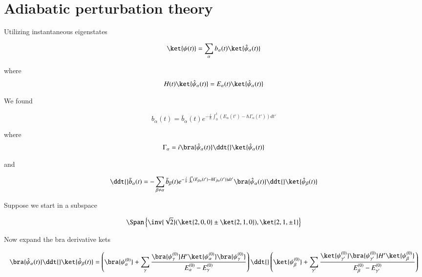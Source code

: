 \section{Adiabatic perturbation theory}

Utilizing instantaneous eigenstates

\begin{equation}\label{eqn:qmTwoR3:390}
\ket{\psi(t)} = \sum_{\alpha} b_\alpha(t) \ket{\hat{\psi}_\alpha(t)}
\end{equation}

where
\begin{equation}\label{eqn:qmTwoR3:410}
H(t) \ket{\hat{\psi}_\alpha(t)}
= E_\alpha(t) \ket{\hat{\psi}_\alpha(t)}
\end{equation}

We found

\begin{equation}\label{eqn:qmTwoR3:430}
b_\alpha(t) = \bar{b}_\alpha(t) e^{-\frac{i}{\hbar} \int_0^t (E_\alpha(t') - \hbar \Gamma_\alpha(t')) dt'}
\end{equation}

where
\begin{equation}\label{eqn:qmTwoR3:450}
\Gamma_\alpha = i
\bra{\hat{\psi}_\alpha(t)}
\ddt{} \ket{\hat{\psi}_\alpha(t)}
\end{equation}

and

\begin{equation}\label{eqn:qmTwoR3:470}
\ddt{}\bar{b}_\alpha(t)
=
-\sum_{\beta \ne \alpha} \bar{b}_\beta(t)
e^{-\frac{i}{\hbar} \int_0^t (E_{\beta\alpha}(t') - \hbar \Gamma_{\beta\alpha}(t')) dt'}
\bra{\hat{\psi}_\alpha(t)}
\ddt{} \ket{\hat{\psi}_\beta(t)}
\end{equation}

Suppose we start in a subspace 

\begin{equation}\label{eqn:qmTwoR3:490}
\Span \left\{
\inv{\sqrt{2}}( \ket{2,0,0} \pm \ket{2,1,0} ), \ket{2, 1, \pm 1}
\right\}
\end{equation}

Now expand the bra derivative kets

\begin{equation}\label{eqn:qmTwoR3:510}
\bra{\hat{\psi}_\alpha(t)}
\ddt{} \ket{\hat{\psi}_\beta(t)}
=
\left(
\bra{\psi_{\alpha}^{(0)}} 
+\sum_{\gamma} \frac{ 
\bra{\psi_\gamma^{(0)}} H' \ket{\psi_\alpha^{(0)}} 
\bra{\psi_\gamma^{(0)}} 
}{
E_\alpha^{(0)} 
-E_\gamma^{(0)} 
}
\right)
\ddt{}
\left(
\ket{\psi_{\beta}^{(0)}} 
+\sum_{\gamma'} \frac{ 
\ket{\psi_{\gamma'}^{(0)}} 
\bra{\psi_{\gamma'}^{(0)}} H' \ket{\psi_\beta^{(0)}} 
}{
E_\beta^{(0)} 
-E_{\gamma'}^{(0)} 
}
\right)
\end{equation}

